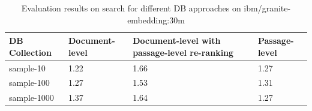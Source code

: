 %

\begin{table}[h]
  \centering
  \caption{Evaluation results on search for different DB approaches on ibm/granite-embedding:30m}
  \scriptsize
    \begin{tabularx}{\textwidth}{lYYY}
    \toprule
    \textbf{DB Collection} & \textbf{Document-level} &
    \textbf{Document-level with passage-level re-ranking} & \textbf{Passage-level} \\
    \midrule
    sample-10   & 1.22 & 1.66 & 1.27 \\
    sample-100  & 1.27 & 1.53 & 1.31 \\
    sample-1000 & 1.37 & 1.64 & 1.27 \\
    \bottomrule
  \end{tabularx}\label{tab:eval-21-results}
\end{table}

